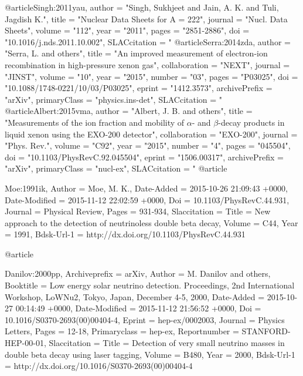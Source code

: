 {{{{}
@article{Singh:2011yau,
      author         = "Singh, Sukhjeet and Jain, A. K. and Tuli, Jagdish K.",
      title          = "{Nuclear Data Sheets for A = 222}",
      journal        = "Nucl. Data Sheets",
      volume         = "112",
      year           = "2011",
      pages          = "2851-2886",
      doi            = "10.1016/j.nds.2011.10.002",
      SLACcitation   = "%
}
@article{Serra:2014zda,
      author         = "Serra, L. and others",
      title          = "{An improved measurement of electron-ion recombination in
                        high-pressure xenon gas}",
      collaboration  = "NEXT",
      journal        = "JINST",
      volume         = "10",
      year           = "2015",
      number         = "03",
      pages          = "P03025",
      doi            = "10.1088/1748-0221/10/03/P03025",
      eprint         = "1412.3573",
      archivePrefix  = "arXiv",
      primaryClass   = "physics.ins-det",
      SLACcitation   = "%
}
@article{Albert:2015vma,
      author         = "Albert, J. B. and others",
      title          = "{Measurements of the ion fraction and mobility of
                        $\alpha$- and $\beta$-decay products in liquid xenon using
                        the EXO-200 detector}",
      collaboration  = "EXO-200",
      journal        = "Phys. Rev.",
      volume         = "C92",
      year           = "2015",
      number         = "4",
      pages          = "045504",
      doi            = "10.1103/PhysRevC.92.045504",
      eprint         = "1506.00317",
      archivePrefix  = "arXiv",
      primaryClass   = "nucl-ex",
      SLACcitation   = "%
}
@article{Moe:1991ik,
	Author = {Moe, M. K.},
	Date-Added = {2015-10-26 21:09:43 +0000},
	Date-Modified = {2015-11-12 22:02:59 +0000},
	Doi = {10.1103/PhysRevC.44.931},
	Journal = {Physical Review},
	Pages = {931-934},
	Slaccitation = {%
	Title = {{New approach to the detection of neutrinoless double beta decay}},
	Volume = {C44},
	Year = {1991},
	Bdsk-Url-1 = {http://dx.doi.org/10.1103/PhysRevC.44.931}}
	
@article{Danilov:2000pp,
	Archiveprefix = {arXiv},
	Author = {M. Danilov and others},
	Booktitle = {{Low energy solar neutrino detection. Proceedings, 2nd International Workshop, LoWNu2, Tokyo, Japan, December 4-5, 2000}},
	Date-Added = {2015-10-27 00:14:49 +0000},
	Date-Modified = {2015-11-12 21:56:52 +0000},
	Doi = {10.1016/S0370-2693(00)00404-4},
	Eprint = {hep-ex/0002003},
	Journal = {Physics Letters},
	Pages = {12-18},
	Primaryclass = {hep-ex},
	Reportnumber = {STANFORD-HEP-00-01},
	Slaccitation = {%
	Title = {{Detection of very small neutrino masses in double beta decay using laser tagging}},
	Volume = {B480},
	Year = {2000},
	Bdsk-Url-1 = {http://dx.doi.org/10.1016/S0370-2693(00)00404-4}}

}}}}}
